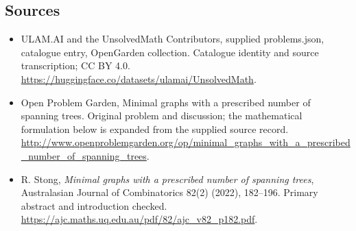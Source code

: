 \documentclass[11pt,a4paper]{article}
\begin{document}
\subsection{Sources}
\begin{itemize}
\item[S1] ULAM.AI and the UnsolvedMath Contributors, supplied problems.json, catalogue entry, OpenGarden collection. Catalogue identity and source transcription; CC BY 4.0.
\url{https://huggingface.co/datasets/ulamai/UnsolvedMath}.
\item[S2] Open Problem Garden, Minimal graphs with a prescribed number of spanning trees. Original problem and discussion; the mathematical formulation below is expanded from the supplied source record.
\url{http://www.openproblemgarden.org/op/minimal_graphs_with_a_prescribed_number_of_spanning_trees}.
\item[R1] R. Stong, \emph{Minimal graphs with a prescribed number of spanning trees}, Australasian Journal of Combinatorics 82(2) (2022), 182--196. Primary abstract and introduction checked.
\url{https://ajc.maths.uq.edu.au/pdf/82/ajc_v82_p182.pdf}.
\end{itemize}
\end{document}
